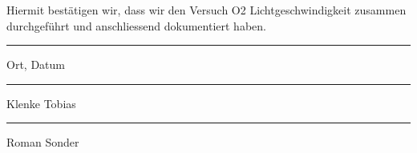 Hiermit bestätigen wir, dass wir den Versuch O2 Lichtgeschwindigkeit zusammen durchgeführt und anschliessend dokumentiert haben.\\[10mm]
\parbox{4cm}{\hrule
\strut \footnotesize Ort, Datum} 
\hfill\parbox{4cm}{\hrule
\strut \footnotesize Klenke Tobias}
\hfill\parbox{4cm}{\hrule
\strut \footnotesize Roman Sonder}